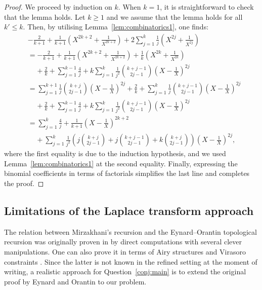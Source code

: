 \documentclass[12pt]{amsart}
\theoremstyle{plain}
\theoremstyle{definition}
\theoremstyle{remark}
\numberwithin{equation}{section}
\begin{document}
\begin{proof}
    We proceed by induction on $k$. When $k=1$, it is straightforward to check that the lemma holds. Let $k\geq1$ and we assume that the lemma holds for all $k'\leq k$. Then, by utilising Lemma~\ref{lem:combinatorics1}, one finds:
    \begin{align*}
        &-\frac{2}{k+1}+\frac{1}{k+1}\left(X^{2k+2}+\frac{1}{X^{2k+2}}\right)+2\sum_{j=1}^{k}\frac{1}{j}\left(X^{2j}+\frac{1}{X^{2j}}\right)\nonumber\\
        &= -\frac{2}{k+1}+\frac{1}{k+1}\left(X^{2k+2}+\frac{1}{X^{2k+2}}\right)+\frac{1}{k}\left(X^{2k}+\frac{1}{X^{2k}}\right)\nonumber\\
        &\;\;\;\;+\frac{2}{k}+\sum_{j=1}^{k-1}\frac{4}{j}+k\sum_{j=1}^k\frac{1}{j^2}\binom{k+j-1}{2j-1}\left(X-\frac{1}{X}\right)^{2j}\nonumber\\
        &=\sum_{j=1}^{k+1}\frac{1}{j}\binom{k+j}{2j-1}\left(X-\frac{1}{X}\right)^{2j}+\frac{2}{k}+\sum_{j=1}^k\frac{1}{j}\binom{k+j-1}{2j-1}\left(X-\frac{1}{X}\right)^{2j}\nonumber\\
        &\;\;\;\;+\frac{2}{k}+\sum_{j=1}^{k-1}\frac{4}{j}+k\sum_{j=1}^k\frac{1}{j^2}\binom{k+j-1}{2j-1}\left(X-\frac{1}{X}\right)^{2j}\nonumber\\
        &=\sum_{j=1}^{k}\frac{4}{j}+\frac{1}{k+1}\left(X-\frac{1}{X}\right)^{2k+2}\nonumber\\
        &\;\;\;\;+\sum_{j=1}^k\frac{1}{j^2}\left(j\binom{k+j}{2j-1}+j\binom{k+j-1}{2j-1}+k\binom{k+j}{2j-1}\right)\left(X-\frac{1}{X}\right)^{2j},
    \end{align*}
    where the first equality is due to the induction hypothesis, and we used Lemma~\ref{lem:combinatorics1} at the second equality. Finally, expressing the binomial coefficients in terms of factorials simplifies the last line and completes the proof.
\end{proof}


\subsection{Limitations of the Laplace transform approach}\label{sec:subtleties_in_question_ref_conj_main}


The relation between Mirzakhani's recursion and the Eynard--Orantin topological recursion was originally proven in \cite{EO07-2} by direct computations with several clever manipulations. One can also prove it in terms of Airy structures and Virasoro constraints \cite{KS17}. Since the latter is not known in the refined setting at the moment of writing, a realistic approach for Question~\ref{conj:main} is to extend the original proof by Eynard and Orantin to our problem. 
\end{document}
